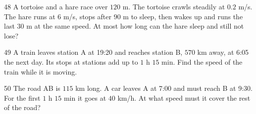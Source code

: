 \gap
\begin{probbox}{48}{}
A tortoise and a hare race over $120$ m. The tortoise crawls steadily at $0.2$ m/s. The hare runs at $6$ m/s, stops after $90$ m to sleep, then wakes up and runs the last $30$ m at the same speed. At most how long can the hare sleep and still not lose?
\end{probbox}
\gap
\begin{probbox}{49}{}
A train leaves station A at 19:20 and reaches station B, $570$ km away, at 6:05 the next day. Its stops at stations add up to $1$ h $15$ min. Find the speed of the train while it is moving.
\end{probbox}
\gap
\begin{probbox}{50}{}
The road AB is $115$ km long. A car leaves A at 7:00 and must reach B at 9:30. For the first $1$ h $15$ min it goes at $40$ km/h. At what speed must it cover the rest of the road?
\end{probbox}
